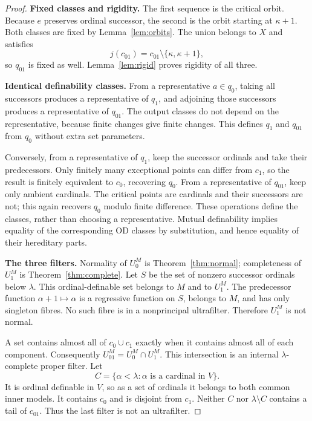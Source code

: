 \documentclass[11pt,letterpaper]{article}
\theoremstyle{definition}
\numberwithin{equation}{section}
\begin{document}
\begin{proof}
\textbf{Fixed classes and rigidity.}
The first sequence is the critical orbit. Because $e$ preserves ordinal successor, the second is the orbit starting at $\kappa+1$. Both classes are fixed by Lemma~\ref{lem:orbits}. The union belongs to $X$ and satisfies
\[
 j(c_{01})=c_{01}\setminus\{\kappa,\kappa+1\},
\]
so $q_{01}$ is fixed as well. Lemma~\ref{lem:rigid} proves rigidity of all three.

\textbf{Identical definability classes.}
From a representative $a\in q_0$, taking all successors produces a representative of $q_1$, and adjoining those successors produces a representative of $q_{01}$. The output classes do not depend on the representative, because finite changes give finite changes. This defines $q_1$ and $q_{01}$ from $q_0$ without extra set parameters.

Conversely, from a representative of $q_1$, keep the successor ordinals and take their predecessors. Only finitely many exceptional points can differ from $c_1$, so the result is finitely equivalent to $c_0$, recovering $q_0$. From a representative of $q_{01}$, keep only ambient cardinals. The critical points are cardinals and their successors are not; this again recovers $q_0$ modulo finite difference. These operations define the classes, rather than choosing a representative. Mutual definability implies equality of the corresponding OD classes by substitution, and hence equality of their hereditary parts.

\textbf{The three filters.}
Normality of $U_0^M$ is Theorem~\ref{thm:normal}; completeness of $U_1^M$ is Theorem~\ref{thm:complete}. Let $S$ be the set of nonzero successor ordinals below $\lambda$. This ordinal-definable set belongs to $M$ and to $U_1^M$. The predecessor function $\alpha+1\mapsto\alpha$ is a regressive function on $S$, belongs to $M$, and has only singleton fibres. No such fibre is in a nonprincipal ultrafilter. Therefore $U_1^M$ is not normal.

A set contains almost all of $c_0\cup c_1$ exactly when it contains almost all of each component. Consequently $U_{01}^M=U_0^M\cap U_1^M$. This intersection is an internal $\lambda$-complete proper filter. Let
\[
 C=\{\alpha<\lambda:\alpha\text{ is a cardinal in }V\}.
\]
It is ordinal definable in $V$, so as a set of ordinals it belongs to both common inner models. It contains $c_0$ and is disjoint from $c_1$. Neither $C$ nor $\lambda\setminus C$ contains a tail of $c_{01}$. Thus the last filter is not an ultrafilter.
\end{proof}
\end{document}
